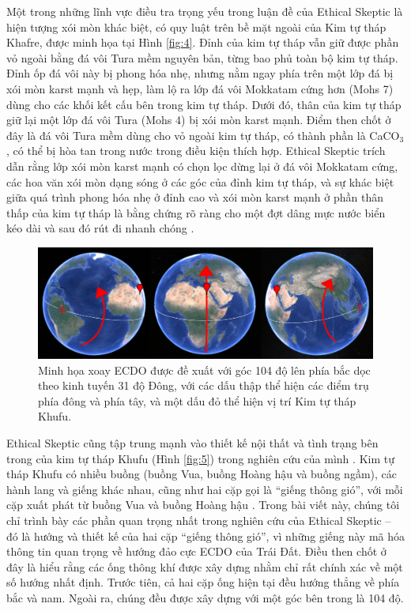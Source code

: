 \documentclass[10pt,twocolumn,letterpaper]{article}
\begin{document}
Một trong những lĩnh vực điều tra trọng yếu trong luận đề của Ethical Skeptic là hiện tượng xói mòn khác biệt, có quy luật trên bề mặt ngoài của Kim tự tháp Khafre, được minh họa tại Hình \ref{fig:4}. Đỉnh của kim tự tháp vẫn giữ được phần vỏ ngoài bằng đá vôi Tura mềm nguyên bản, từng bao phủ toàn bộ kim tự tháp. Đỉnh ốp đá vôi này bị phong hóa nhẹ, nhưng nằm ngay phía trên một lớp đá bị xói mòn karst mạnh và hẹp, làm lộ ra lớp đá vôi Mokkatam cứng hơn (Mohs 7) dùng cho các khối kết cấu bên trong kim tự tháp. Dưới đó, thân của kim tự tháp giữ lại một lớp đá vôi Tura (Mohs 4) bị xói mòn karst mạnh. Điểm then chốt ở đây là đá vôi Tura mềm dùng cho vỏ ngoài kim tự tháp, có thành phần là CaCO$_3$, có thể bị hòa tan trong nước trong điều kiện thích hợp. Ethical Skeptic trích dẫn rằng lớp xói mòn karst mạnh có chọn lọc dừng lại ở đá vôi Mokkatam cứng, các hoa văn xói mòn dạng sóng ở các góc của đỉnh kim tự tháp, và sự khác biệt giữa quá trình phong hóa nhẹ ở đỉnh cao và xói mòn karst mạnh ở phần thân thấp của kim tự tháp là bằng chứng rõ ràng cho một đợt dâng mực nước biển kéo dài và sau đó rút đi nhanh chóng \cite{27}.

\begin{figure}[b]
\begin{center}
\includegraphics[width=1\textwidth]{drawing.jpg}
\end{center}
   \caption{Minh họa xoay ECDO được đề xuất với góc 104 độ lên phía bắc dọc theo kinh tuyến 31 độ Đông, với các dấu thập thể hiện các điểm trụ phía đông và phía tây, và một dấu đỏ thể hiện vị trí Kim tự tháp Khufu.}
\label{fig:6}
\end{figure}

Ethical Skeptic cũng tập trung mạnh vào thiết kế nội thất và tình trạng bên trong của kim tự tháp Khufu (Hình \ref{fig:5}) trong nghiên cứu của mình \cite{28}. Kim tự tháp Khufu có nhiều buồng (buồng Vua, buồng Hoàng hậu và buồng ngầm), các hành lang và giếng khác nhau, cũng như hai cặp gọi là “giếng thông gió”, với mỗi cặp xuất phát từ buồng Vua và buồng Hoàng hậu \cite{29,30}. Trong bài viết này, chúng tôi chỉ trình bày các phần quan trọng nhất trong nghiên cứu của Ethical Skeptic – đó là hướng và thiết kế của hai cặp “giếng thông gió”, vì những giếng này mã hóa thông tin quan trọng về hướng đảo cực ECDO của Trái Đất.
Điều then chốt ở đây là hiểu rằng các ống thông khí được xây dựng nhằm chỉ rất chính xác về một số hướng nhất định. Trước tiên, cả hai cặp ống hiện tại đều hướng thẳng về phía bắc và nam. Ngoài ra, chúng đều được xây dựng với một góc bên trong là 104 độ.
\end{document}
